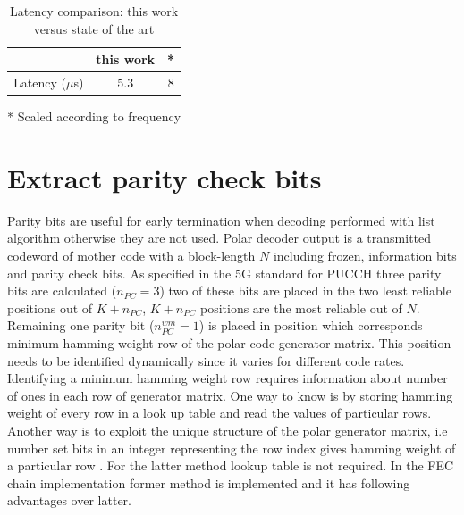 \begin{table}[!h]
		\begin{center}
		\caption{Latency comparison: this work versus state of the art \cite{lowLatencySWPolarDec}}
		\label{tab:decoderLatencyStateofTheART}
		\begin{threeparttable}
		\begin{tabular}{c|c|c} %
			\textbf{ } & this work & \cite{lowLatencySWPolarDec}* \\
			\hline
			Latency ($\mu$s) & $5.3$ & $8$\\
			\hline
		\end{tabular}
	\begin{tablenotes}\footnotesize
		\item[*] Scaled according to frequency
	\end{tablenotes}
	\end{threeparttable}
	\end{center}
\end{table}

\section{Extract parity check bits}
Parity bits are useful for early termination when decoding performed with list algorithm otherwise they are not used. Polar decoder output is a transmitted codeword of mother code with a block-length $N$ including frozen, information bits and parity check bits. As specified in the 5G standard \cite{3gpp.38.212} for PUCCH three parity bits are calculated ($n_{PC} = 3$) two of these bits are placed in the two least reliable positions out of $K+n_{PC}$, $K+n_{PC}$ positions are the most reliable out of $N$. Remaining one parity bit ($ n_{PC}^{wm} = 1 $) is placed in position which corresponds minimum hamming weight row of the polar code generator matrix. This position needs to be identified dynamically since it varies for different code rates. Identifying a minimum hamming weight row requires information about number of ones in each row of generator matrix. One way to know is by storing hamming weight of every row in a look up table and read the values of particular rows. Another way is to exploit the unique structure of the polar generator matrix, i.e number set bits in an integer representing the row index gives hamming weight of a particular row \cite{DesignOfPolarCodes5G}. For the latter method lookup table is not required. In the FEC chain implementation former method is implemented and it has following advantages over latter.

